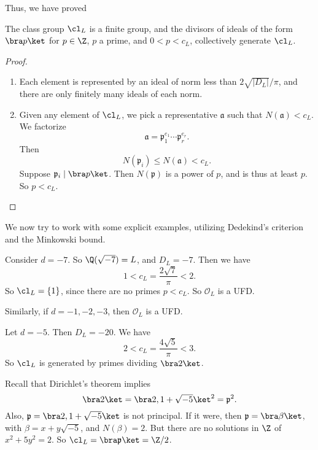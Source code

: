 \documentclass[a4paper]{article}
\begin{document}
Thus, we have proved
\begin{thm}
  The class group $\cl_L$ is a finite group, and the divisors of ideals of the form $\bra p\ket$ for $p \in \Z$, $p$ a prime, and $0 < p < c_L$, collectively generate $\cl_L$.
\end{thm}

\begin{proof}\leavevmode
  \begin{enumerate}
    \item Each element is represented by an ideal of norm less than $2\sqrt{|D_L|}/\pi$, and there are only finitely many ideals of each norm.
    \item Given any element of $\cl_L$, we pick a representative $\mathfrak{a}$ such that $N(\mathfrak{a}) < c_L$. We factorize
      \[
        \mathfrak{a}= \mathfrak{p}_1^{e_1} \cdots \mathfrak{p}_r^{e_r}.
      \]
      Then
      \[
        N(\mathfrak{p}_i) \leq N(\mathfrak{a}) < c_L.
      \]
      Suppose $\mathfrak{p}_i \mid \bra p\ket$. Then $N(\mathfrak{p})$ is a power of $p$, and is thus at least $p$. So $p < c_L$.
  \end{enumerate}
\end{proof}

We now try to work with some explicit examples, utilizing Dedekind's criterion and the Minkowski bound.
\begin{eg}
  Consider $d = -7$. So $\Q(\sqrt{-7}) = L$, and $D_L = -7$. Then we have
  \[
    1 < c_L = \frac{2\sqrt{7}}{\pi} < 2.
  \]
  So $\cl_L = \{1\}$, since there are no primes $p < c_L$. So $\mathcal{O}_L$ is a UFD.

  Similarly, if $d = -1, -2, -3$, then $\mathcal{O}_L$ is a UFD.
\end{eg}

\begin{eg}
  Let $d = -5$. Then $D_L = -20$. We have
  \[
    2 < c_L = \frac{4\sqrt{5}}{\pi} < 3.
  \]
  So $\cl_L$ is generated by primes dividing $\bra 2\ket$.

  Recall that Dirichlet's theorem implies
  \[
    \bra 2\ket = \bra 2, 1 + \sqrt{-5}\ket^2 = \mathfrak{p}^2.
  \]
  Also, $\mathfrak{p} = \bra 2, 1 + \sqrt{-5}\ket$ is not principal. If it were, then $\mathfrak{p} = \bra \beta\ket$, with $\beta = x + y \sqrt{-5}$, and $N(\beta) = 2$. But there are no solutions in $\Z$ of $x^2 + 5y^2 = 2$. So $\cl_L = \bra \mathfrak{p}\ket = \Z/2$.
\end{eg}
\end{document}
